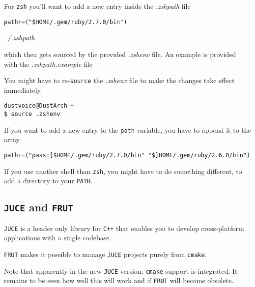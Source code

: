 \documentclass[10pt]{dustdoc}
\begin{document}
For \texttt{zsh} you’ll want to add a new entry inside the \textit{.zshpath} file

\begin{mintedlisting}
    \begin{verbatim}
path+=("$HOME/.gem/ruby/2.7.0/bin")
    \end{verbatim}

    \caption{\textit{~/.zshpath}}
\end{mintedlisting}

\noindent
which then gets sourced by the provided \textit{.zshenv} file.
An example is provided with the \textit{.zshpath.example} file

\begin{NOTE}
    You might have to re-\texttt{source} the \textit{.zshenv} file to make the changes take effect immediately

    \begin{verbatim}
dustvoice@DustArch ~
$ source .zshenv
    \end{verbatim}
\end{NOTE}
\begin{NOTE}
    If you want to add a new entry to the \texttt{path} variable, you have to append it to the array

    \begin{verbatim}
path+=("pass:[$HOME/.gem/ruby/2.7.0/bin" "$]HOME/.gem/ruby/2.6.0/bin")
    \end{verbatim}
\end{NOTE}
\begin{NOTE}
    If you use another shell than \texttt{zsh}, you might have to do something different, to add a directory to your \texttt{PATH}.

\end{NOTE}

\subsection{\texttt{JUCE} and \texttt{FRUT}}
\label{sec:juce-and-frut}

\texttt{JUCE} is a header only library for \texttt{C++} that enables you to develop cross-platform applications with a single codebase.

\texttt{FRUT} makes it possible to manage \texttt{JUCE} projects purely from \texttt{cmake}.

\begin{NOTE}
    Note that apparently in the new \texttt{JUCE} version, \texttt{cmake} support is integrated.
    It remains to be seen how well this will work and if \texttt{FRUT} will become obsolete.
\end{NOTE}
\end{document}
